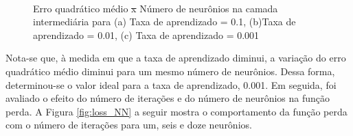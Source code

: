 \documentclass[brazil,tf,epusp]{usp}  %
\providecommand{\DIFadd}[1]{{\protect\color{blue}\uwave{#1}}} %
\providecommand{\DIFdel}[1]{{\protect\color{red}\sout{#1}}}                      %
\providecommand{\DIFaddFL}[1]{\DIFadd{#1}} %
\providecommand{\DIFdelFL}[1]{\DIFdel{#1}} %
\providecommand{\DIFaddbeginFL}{} %
\providecommand{\DIFaddendFL}{} %
\providecommand{\DIFdelbeginFL}{} %
\providecommand{\DIFdelendFL}{} %
\begin{document}
\begin{figure}[!h]
\hfill
{}\\
\caption{Erro quadrático médio \DIFdelbeginFL \DIFdelFL{x }\DIFdelendFL \DIFaddbeginFL \DIFaddFL{vs. }\DIFaddendFL Número de neurônios na camada intermediária para (a) Taxa de aprendizado = 0.1, (b)Taxa de aprendizado = 0.01, (c) Taxa de aprendizado = 0.001}
\label{fig:test_NN}
\end{figure}

Nota-se que, à medida em que a taxa de aprendizado diminui, a variação do erro quadrático médio diminui para um mesmo número de neurônios. Dessa forma, determinou-se o valor ideal para a taxa de aprendizado, 0.001.
Em seguida, foi avaliado o efeito do número de iterações e do número de neurônios na função perda. A Figura \ref{fig:loss_NN} a seguir mostra o comportamento da função perda com o número de iterações para um, seis e doze neurônios.
\end{document}
